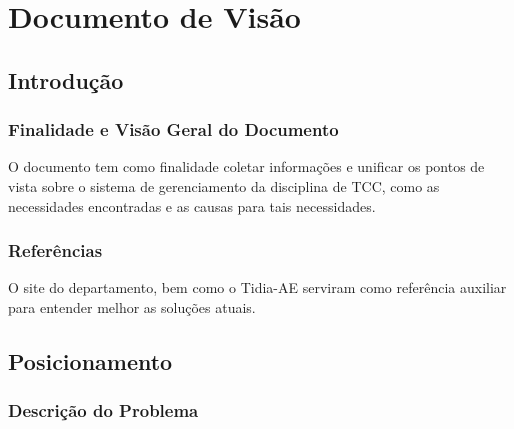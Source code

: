 \chapter{Documento de Visão}\label{chap:vision-doc-appendix}

\section{Introdução}
\subsection{Finalidade e Visão Geral do Documento}

O documento tem como finalidade coletar informações e unificar os pontos de vista sobre o sistema de gerenciamento da disciplina de TCC, como as necessidades encontradas e as causas para tais necessidades.

\subsection{Referências}

O site do departamento, bem como o Tidia-AE serviram como referência auxiliar para entender melhor as soluções atuais.

\section{Posicionamento}
\subsection{Descrição do Problema}

\begin{table}[!htb]
    \centering
    \caption{Descrição básica do problema}
    \label{tab:descricao-problema}
\end{table}

